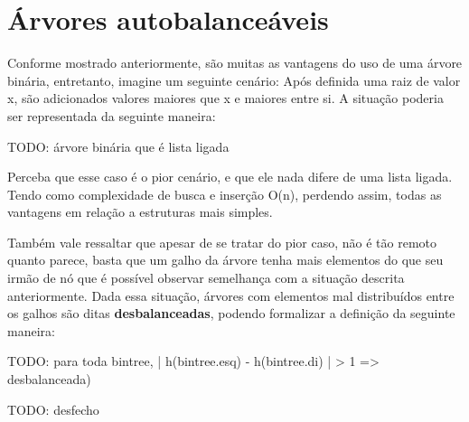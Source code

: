 \chapter{Árvores autobalanceáveis}
\label{ch:auto_bal} %

%

Conforme mostrado anteriormente, são muitas as vantagens do uso de uma árvore binária, entretanto, imagine um seguinte cenário: Após definida uma raiz de valor x, são adicionados valores maiores que x e maiores entre si. A situação poderia ser representada da seguinte maneira:

TODO: árvore binária que é lista ligada

Perceba que esse caso é o pior cenário, e que ele nada difere de uma lista ligada. Tendo como complexidade de busca e inserção O(n), perdendo assim, todas as vantagens em relação a estruturas mais simples.

Também vale ressaltar que apesar de se tratar do pior caso, não é tão remoto quanto parece, basta que um galho da árvore tenha mais elementos do que seu irmão de nó que é possível observar semelhança com a situação descrita anteriormente. Dada essa situação, árvores com elementos mal distribuídos entre os galhos são ditas \textbf{desbalanceadas}, podendo formalizar a definição da seguinte maneira:

TODO: para toda bintree, | h(bintree.esq) - h(bintree.di) | > 1 => desbalanceada)

TODO: desfecho


\newpage
%
% 
